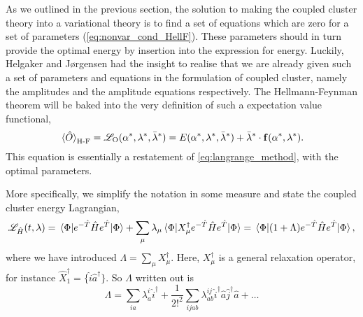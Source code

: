 As we outlined in the previous section, the solution to making the coupled cluster 
theory into a variational theory is to find a set of equations which are zero for a set
of parameters (\autoref{eq:nonvar_cond_HellF}). These parameters should in turn provide the optimal energy by insertion 
into the expression for energy. Luckily, Helgaker and 
Jørgensen\cite{helgaker1988analytical,helgaker1989configuration} had the insight to 
realise that we are already given such a set of parameters and equations in the 
formulation of coupled cluster, namely the amplitudes and the amplitude equations
respectively. The Hellmann-Feynman theorem will be baked into the very definition 
of such a expectation value functional,
\begin{equation}
    \ev*{\hat{O}}_{\text{H-F}} 
        = \mathscr{L}_{\text{O}}(\alpha^*, \vb{\lambda}^*, \bar{\vb{\lambda}}^*)
        = E(\alpha^*, \vb{\lambda}^*, \bar{\vb{\lambda}}^*)
        + \bar{\vb{\lambda}}^* \cdot \vb{f}(\alpha^*, \vb{\lambda}^*).
\end{equation}
This equation is essentially a restatement of \autoref{eq:langrange_method}, with  
the optimal parameters.

More specifically, we simplify the notation in some measure and state the coupled
cluster energy Lagrangian,
\begin{equation}
    \label{eq:cc_energy_lagrangian}
    \mathscr{L}_{\hat{H}}(t, \lambda) 
        = \mel{\Phi}{e^{-\hat{T}}\hat{H}e^{\hat{T}}}{\Phi}
        + \sum_\mu \lambda_\mu \mel{\Phi}{X_\mu^\dagger e^{-\hat{T}} \hat{H} e^{\hat{T}}}{\Phi}
        = \mel{\Phi}{(1 + \Lambda)e^{-\hat{T}}\hat{H}e^{\hat{T}} }{\Phi},
\end{equation}
where we have introduced $\Lambda = \sum_\mu X^\dagger_\mu$. Here, $X^\dagger_\mu$ is a
general relaxation operator, for instance $\hat{X}_1^\dagger = \{\hat{i}\hat{a}^\dagger\}$.
So $\Lambda$ written out is 
\begin{equation}
    \Lambda = \sum_{ia}\lambda^i_a \hat{i}^\dagger 
    + \frac{1}{2!^2}\sum_{ijab} 
        \lambda^{ij}_{ab} \hat{i}^\dagger \hat{a} \hat{j}^\dagger \hat{a}
    + \dots
\end{equation}

